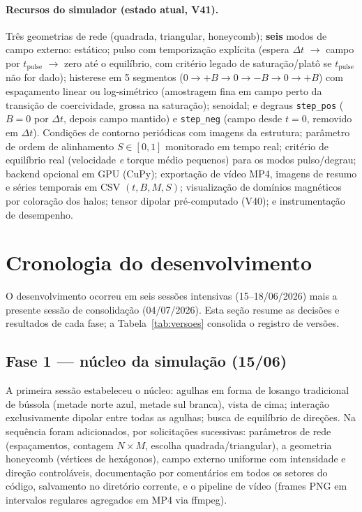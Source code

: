 \documentclass[11pt,a4paper]{article}
\newcommand{\code}[1]{\texttt{#1}}
\begin{document}
\paragraph{Recursos do simulador (estado atual, V41).}
Três geometrias de rede (quadrada, triangular, honeycomb); \textbf{seis}
modos de campo externo: estático; pulso com temporização explícita
(espera $\Delta t$ $\to$ campo por $t_{\mathrm{pulse}}$ $\to$ zero até o
equilíbrio, com critério legado de saturação/platô se
$t_{\mathrm{pulse}}$ não for dado); histerese em 5 segmentos
($0 \to +B \to 0 \to -B \to 0 \to +B$) com espaçamento linear ou
log-simétrico (amostragem fina em campo perto da transição de
coercividade, grossa na saturação); senoidal; e degraus
\code{step\_pos} ($B{=}0$ por $\Delta t$, depois campo mantido) e
\code{step\_neg} (campo desde $t{=}0$, removido em $\Delta t$).
Condições de contorno periódicas com imagens da estrutura; parâmetro
de ordem de alinhamento $S \in [0,1]$ monitorado em tempo real; critério
de equilíbrio real (velocidade \emph{e} torque médio pequenos) para os
modos pulso/degrau; backend opcional em GPU (CuPy); exportação de vídeo
MP4, imagens de resumo e séries temporais em CSV $(t, B, M, S)$;
visualização de domínios magnéticos por coloração dos halos; tensor
dipolar pré-computado (V40); e instrumentação de desempenho.

\section{Cronologia do desenvolvimento}

O desenvolvimento ocorreu em seis sessões intensivas (15--18/06/2026)
mais a presente sessão de consolidação (04/07/2026). Esta seção resume
as decisões e resultados de cada fase; a
Tabela~\ref{tab:versoes} consolida o registro de versões.

\subsection{Fase 1 --- núcleo da simulação (15/06)}

A primeira sessão estabeleceu o núcleo: agulhas em forma de losango
tradicional de bússola (metade norte azul, metade sul branca), vista de
cima; interação exclusivamente dipolar entre todas as agulhas; busca de
equilíbrio de direções. Na sequência foram adicionados, por solicitações
sucessivas: parâmetros de rede (espaçamentos, contagem $N \times M$,
escolha quadrada/triangular), a geometria honeycomb (vértices de
hexágonos), campo externo uniforme com intensidade e direção
controláveis, documentação por comentários em todos os setores do
código, salvamento no diretório corrente, e o pipeline de vídeo
(frames PNG em intervalos regulares agregados em MP4 via ffmpeg).
\end{document}
